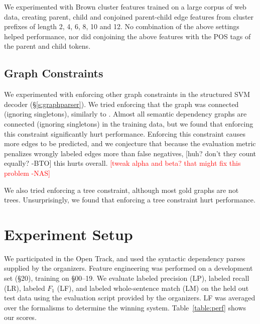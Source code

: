 \documentclass[11pt]{article}
\newcommand{\bocomment}[1]{\textcolor{Bittersweet}{[#1 -BTO]}}
\newcommand{\nas}[1]{\textcolor{red}{[#1 -NAS]}}
\begin{document}
We experimented with Brown cluster features \cite{Brown:1992:CNG:176313.176316}
trained on a large corpus of web data, creating parent, child and conjoined parent-child edge features from cluster prefixes of length 2, 4, 6, 8, 10 and 12. No combination of the above settings helped performance, nor did conjoining the above features with the POS tags of the parent and
child tokens.

\subsection{Graph Constraints}
\label{s:badconstraints}

We experimented with enforcing other graph constraints in the structured SVM
decoder (\S\ref{s:graphparser}).
We tried enforcing that the graph was connected (ignoring singletons), similarly
to .
Almost all semantic dependency graphs are connected (ignoring singletons) in the
training data, but we found that enforcing this constraint significantly hurt
performance.
Enforcing this constraint causes more edges to be predicted, and we conjecture
that because the evaluation metric penalizes wrongly labeled edges more than
false negatives, 
\bocomment{huh? don't they count equally?}
this hurts overall. \nas{tweak alpha and beta?  that might fix this problem}

We also tried enforcing a tree constraint, although most gold graphs are not
trees.
Unsurprisingly, we found that enforcing a tree constraint hurt performance.



\section{Experiment Setup}
\label{s:evaluation}

We participated in the Open Track, and used the syntactic dependency parses supplied by the organizers.  Feature engineering was performed on a development set (\S 20), training on \S 00--19.
We evaluate labeled precision (LP), labeled recall (LR), labeled $F_1$ (LF), and
labeled whole-sentence match (LM) on the held out test data using the
evaluation script provided by the organizers. 
LF was averaged over the formalisms to determine the winning system.
Table~\ref{table:perf} shows our scores.

% 
% 
% 
% 
\end{document}
